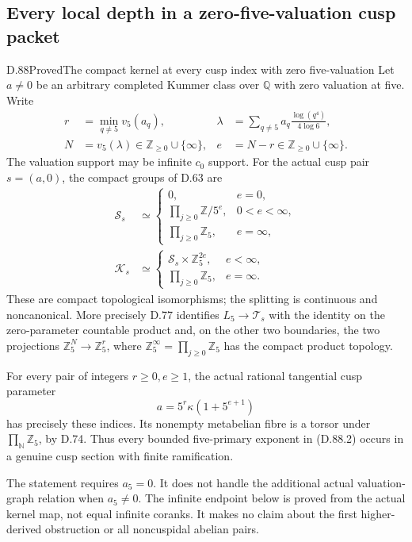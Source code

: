 \subsection{Every local depth in a zero-five-valuation cusp packet}

\begin{statement}{D.88}{Proved}{The compact kernel at every cusp index with zero five-valuation}
Let \(a\ne0\) be an arbitrary completed Kummer class over
\(\mathbb Q\) with zero valuation at five. Write
\[
 \begin{aligned}
 r&=\min_{q\ne5}v_5(a_q),&
 \lambda&=\sum_{q\ne5}a_q\frac{\log(q^4)}{4\log6},\\
 N&=v_5(\lambda)\in\mathbb Z_{\ge0}\cup\{\infty\},&
 e&=N-r\in\mathbb Z_{\ge0}\cup\{\infty\}.
 \end{aligned}                                           \tag{D.88.1}
\]
The valuation support may be infinite \(c_0\) support. For the
actual cusp pair \(s=(a,0)\), the compact groups of D.63 are
\[
 \begin{aligned}
 \mathcal S_s&\simeq
 \begin{cases}
  0,&e=0,\\
  \displaystyle\prod_{j\ge0}\mathbb Z/5^e,&0<e<\infty,\\
  \displaystyle\prod_{j\ge0}\mathbb Z_5,&e=\infty,
 \end{cases}\\
 \mathcal K_s&\simeq
 \begin{cases}
  \mathcal S_s\times\mathbb Z_5^{2e},&e<\infty,\\
  \displaystyle\prod_{j\ge0}\mathbb Z_5,&e=\infty.
 \end{cases}
 \end{aligned}                                           \tag{D.88.2}
\]
These are compact topological isomorphisms; the splitting is
continuous and noncanonical. More precisely D.77 identifies
\(L_5\to\mathcal T_s\) with the identity on the zero-parameter
countable product and, on the other two boundaries, the two
projections \(\mathbb Z_5^N\to\mathbb Z_5^r\),
where \(\mathbb Z_5^\infty=\prod_{j\ge0}\mathbb Z_5\)
has the compact product topology.

For every pair of integers \(r\ge0,e\ge1\), the actual rational tangential
cusp parameter
\[
                    a=5^r\kappa(1+5^{e+1})             \tag{D.88.3}
\]
has precisely these indices. Its nonempty metabelian fibre is
a torsor under \(\prod_{\mathbb N}\mathbb Z_5\), by D.74.
Thus every bounded five-primary exponent in (D.88.2) occurs
in a genuine cusp section with finite ramification.

The statement requires \(a_5=0\).
It does not handle the additional actual valuation-graph
relation when \(a_5\ne0\). The infinite endpoint below
is proved from the actual kernel map, not equal infinite coranks. It makes no claim about the first
higher-derived obstruction or all noncuspidal abelian pairs.
\end{statement}

